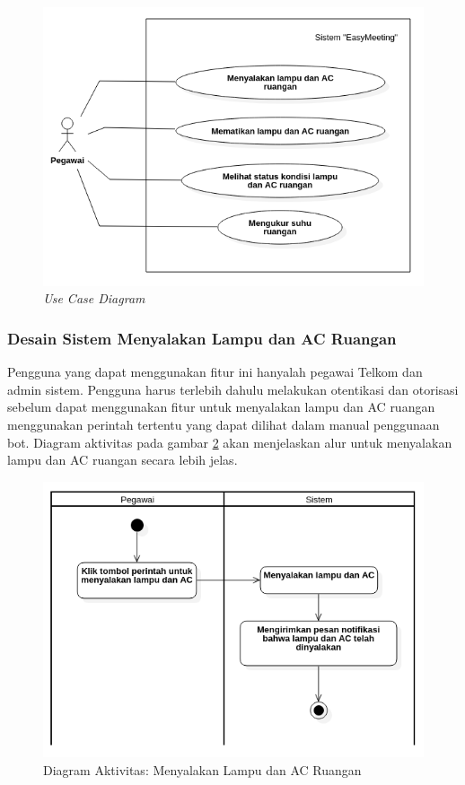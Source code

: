 \begin{figure}[H]
	\centerline {
		\includegraphics[width=\linewidth]{bab4/img/uc_diagram.png}
	}
	\caption{\textit{Use Case Diagram}}
	\label{figure:usecase}
\end{figure}

\subsubsection{Desain Sistem Menyalakan Lampu dan AC Ruangan}
\tab Pengguna yang dapat menggunakan fitur ini hanyalah pegawai Telkom dan admin sistem. Pengguna harus terlebih dahulu melakukan otentikasi dan otorisasi sebelum dapat menggunakan fitur untuk menyalakan lampu dan AC ruangan menggunakan perintah tertentu yang dapat dilihat dalam manual penggunaan bot. Diagram aktivitas pada gambar \ref{figure:activity_1} akan menjelaskan alur untuk menyalakan lampu dan AC ruangan secara lebih jelas.

\begin{figure}[H]
	\centerline {
		\includegraphics[width=\linewidth]{bab4/img/activity_diagram_menyalakan.png}
	}
	\caption{Diagram Aktivitas: Menyalakan Lampu dan AC Ruangan}
	\label{figure:activity_1}
\end{figure}

